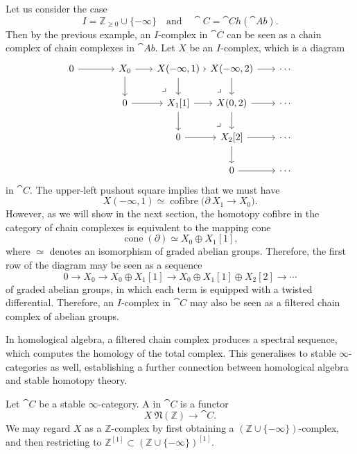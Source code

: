 \begin{example}
    Let us consider the case
    \[I=\mathbb{Z}_{\geq0}\cup\{-\infty\}\quad\text{and}\quad
    \cat{C}=\cat{Ch}(\cat{Ab}).\]
    Then by the previous example, 
    an $I$-complex in $\cat{C}$ can be seen as
    a chain complex of chain complexes in $\cat{Ab}$.
    Let $X$ be an $I$-complex, which is a diagram 
    \[\begin{tikzcd}[column sep={5.5em,between origins}]
        0\ar[r] & X_0\ar[r]\ar[d]\ar[dr,phantom,end anchor={[xshift=-.5em]north},pos=.75,"\lrcorner"] &
        X(-\infty,1)\ar[r]\ar[d]\ar[dr,phantom,end anchor={[xshift=-.5em]north},pos=.75,"\lrcorner"] &
        X(-\infty,2)\ar[r]\ar[d] & \cdots \\
        & 0\ar[r] & X_1[1]\ar[r]\ar[d]\ar[dr,phantom,end anchor={[xshift=-.5em]north},pos=.75,"\lrcorner"] &
        X(0,2) \ar[r]\ar[d] & \cdots \\
        && 0\ar[r] & X_2[2]\ar[r]\ar[d] & \cdots \\
        &&& 0\ar[r] & \cdots
    \end{tikzcd}\]
    in $\cat{C}$. The upper-left pushout square implies that we must have
    \[X(-\infty,1)\simeq\operatorname{cofibre}\bigl(\partial\:X_1\to X_0\bigr).\]
    However, as we will show in the next section,
    the homotopy cofibre in the category of chain complexes 
    is equivalent to the mapping cone
    \[\operatorname{cone}(\partial)\simeq X_0\oplus X_1[1],\]
    where $\simeq$ denotes an isomorphism of graded abelian groups.
    Therefore, the first row of the diagram may be seen as a sequence 
    \[0\to X_0\to X_0\oplus X_1[1]\to X_0\oplus X_1[1]\oplus X_2[2]\to\cdots\]
    of graded abelian groups,
    in which each term is equipped with a twisted differential.
    Therefore, an $I$-complex in $\cat{C}$
    may also be seen as a filtered chain complex 
    of abelian groups. \varqed
\end{example}

In homological algebra, a filtered chain complex produces a spectral sequence,
which computes the homology of the total complex.
This generalises to stable $\infty$-categories as well,
establishing a further connection between homological algebra
and stable homotopy theory.

\begin{definition}
    Let $\cat{C}$ be a stable $\infty$-category.
    A  in $\cat{C}$ is a functor 
    \[X\:\mathfrak N(\mathbb{Z})\to\cat{C}.\]
    We may regard $X$ as a $\mathbb{Z}$-complex
    by first obtaining a $(\mathbb{Z}\cup\{-\infty\})$-complex,
    and then restricting to $\mathbb{Z}^{[1]}\subset(\mathbb{Z}\cup\{-\infty\})^{[1]}$.
\end{definition}


